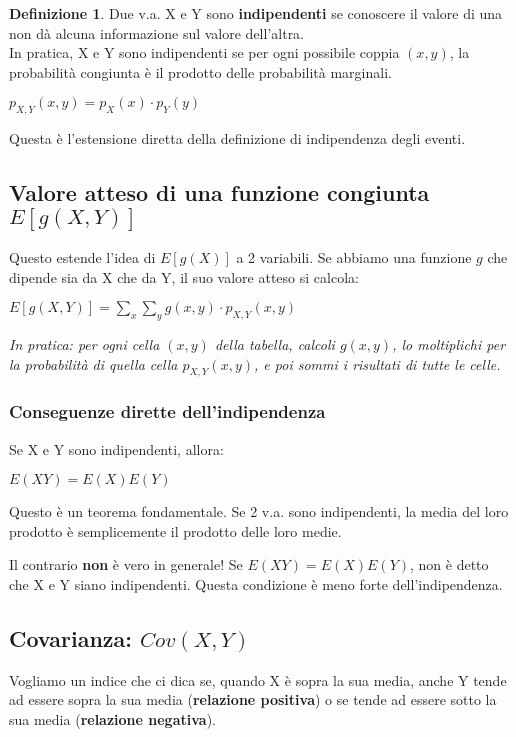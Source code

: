 \documentclass[a4paper, 11pt]{article}
\theoremstyle{definition}
\newtheorem{definizione}{Definizione}[section]
\begin{document}
\begin{definizione}
Due v.a. X e Y sono \textbf{indipendenti} se conoscere il valore di una non dà alcuna informazione sul valore dell'altra. \\
In pratica, X e Y sono indipendenti se per ogni possibile coppia $(x,y)$, la probabilità congiunta è il prodotto delle probabilità marginali.
\begin{formulabox}
    $p_{X,Y}(x,y) = p_X(x) \cdot p_Y(y)$
\end{formulabox}
Questa è l'estensione diretta della definizione di indipendenza degli eventi.
\end{definizione}

\subsection{Valore atteso di una funzione congiunta $E[g(X,Y)]$}
Questo estende l'idea di $E[g(X)]$ a 2 variabili. Se abbiamo una funzione $g$ che dipende sia da X che da Y, il suo valore atteso si calcola:
\begin{formulabox}
    $E[g(X,Y)] = \sum_x \sum_y g(x,y) \cdot p_{X,Y}(x,y)$
\end{formulabox}
\textit{In pratica: per ogni cella $(x,y)$ della tabella, calcoli $g(x,y)$, lo moltiplichi per la probabilità di quella cella $p_{X,Y}(x,y)$, e poi sommi i risultati di tutte le celle.}

\newpage

\subsubsection{Conseguenze dirette dell'indipendenza}
Se X e Y sono indipendenti, allora:
\begin{formulabox}
    $E(XY) = E(X)E(Y)$
\end{formulabox}
Questo è un teorema fondamentale. Se 2 v.a. sono indipendenti, la media del loro prodotto è semplicemente il prodotto delle loro medie.

\begin{tcolorbox}[colback=red!10!white, colframe=red!75!black, title=Attenzione]
Il contrario \textbf{non} è vero in generale! Se $E(XY)=E(X)E(Y)$, non è detto che X e Y siano indipendenti. Questa condizione è meno forte dell'indipendenza.
\end{tcolorbox}

\subsection{Covarianza: $Cov(X,Y)$}
Vogliamo un indice che ci dica se, quando X è sopra la sua media, anche Y tende ad essere sopra la sua media (\textbf{relazione positiva}) o se tende ad essere sotto la sua media (\textbf{relazione negativa}).
\end{document}
